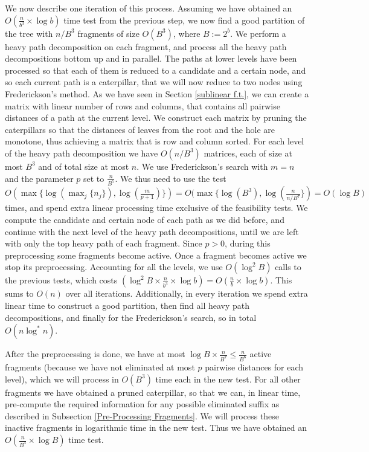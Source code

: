 \documentclass[11pt,a4paper]{article}
\theoremstyle{definition}
\theoremstyle{remark}
\begin{document}
We now describe one iteration of this process. Assuming we have obtained an $O(\frac{n}{b^3} \times \log b)$ time 
test from the previous step, we now find a good partition of the tree with $n/B^{3}$ fragments of size $O(B^3)$, 
where $B:=2^b$. We perform a heavy path decomposition on each fragment, and process all the heavy
path decompositions bottom up and in parallel. The paths at lower levels have been processed so that each of them is
reduced to a candidate and a certain node, and so each current path is a caterpillar, that we will now reduce to
two nodes using Frederickson's method. As we have seen in Section \ref{sublinear f.t.}, we can create a matrix 
with linear number of rows and columns, that contains all pairwise distances of a path at the current level. We 
construct each matrix by pruning the caterpillars so that the distances of leaves from the root and the hole are monotone, thus achieving a matrix that is row and column sorted. For each level of the heavy path decomposition
we have $O(n/B^3)$ matrices, each of size at most $B^{3}$ and of total size at most $n$.
We use Frederickson's search with $m=n$ and the parameter $p$ set to $\frac{n}{B^7}$. We thus need to use the
test $O(\max \lbrace \log(\max_{j} \lbrace n_j \rbrace), \log(\frac{m}{p+1}) \rbrace) = O(\max \lbrace \log (B^{3}), \log(\frac{n}{n/B^{7}} \rbrace) = O(\log B)$ times, and spend extra linear processing time exclusive of the feasibility tests. We compute the candidate and certain node of each path as we did before, and continue with the next level
of the heavy path decompositions, until we are left with only the top heavy path of each fragment.
Since $p>0$, during this preprocessing some fragments become active. Once a fragment becomes active we stop
its preprocessing. Accounting for all the levels, we use $O(\log^{2}B)$ calls to the previous tests,
which costs $(\log ^2B \times \frac{n}{b^3} \times \log b)=O(\frac{n}{b} \times \log b)$. This sums to $O(n)$
over all iterations.
Additionally, in every iteration we spend extra linear time to construct a good partition, then find all heavy
path decompositions, and finally for the Frederickson's search, so in total $O(n \log ^*n)$. 

After the preprocessing is done, we have at most $\log B \times \frac{n}{B^7}\leq \frac{n}{B^{6}}$ active fragments (because we have not eliminated at most $p$ pairwise distances for each level), which we will process in $O(B^{3})$
time each in the new test. For all other fragments we have obtained a pruned caterpillar, so that we can, in linear time, pre-compute the required information for any possible eliminated suffix as described in Subsection \ref{Pre-Processing Fragments}. We will process these inactive fragments in logarithmic time in the new test. Thus we have obtained an $O(\frac{n}{B^3} \times \log B)$ time test.
\end{document}
